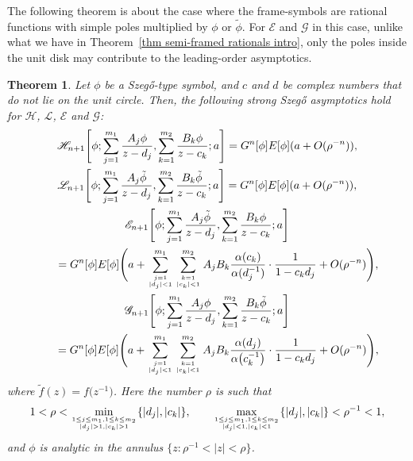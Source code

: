 \documentclass[10pt,a4paper]{amsart}
\numberwithin{equation}{section}
\newtheorem{Theorem}{Theorem}[section]
\newcommand{\al}{\alpha}
\newcommand{\di}{\displaystyle}
\begin{document}
	The following theorem is about the case where the frame-symbols are rational functions with simple poles multiplied by $\phi$ or $\tilde{\phi}$. For $\mathscr{E}$ and $\mathscr{G}$ in this case, unlike what we have in Theorem~\ref{thm semi-framed rationals intro}, only the poles inside the unit disk may contribute to the leading-order asymptotics.
	\begin{Theorem}\label{thm semi-framed rationals . phi intro} Let $\phi$ be a Szeg\H{o}-type symbol, and $c$ and $d$ be complex numbers that do not lie on the unit circle. Then, the following strong Szeg\H{o} asymptotics hold for $\mathscr{H}$, $\mathscr{L}$, $\mathscr{E}$ and $\mathscr{G}$:
		\begin{gather}
			\mathscr{H}_{n+1}\Bigg[\phi; \di \sum_{j=1}^{m_1} \di \frac{A_j \phi}{z-d_j}, \sum_{k=1}^{m_2} \di \frac{B_k\phi}{z-c_k};a\Bigg] = G^n[\phi] E[\phi] (a + O(\rho^{-n})),\label{asymp H rationals lin comb1}	
\\
			\mathscr{L}_{n+1}\Bigg[\phi; \di \sum_{j=1}^{m_1} \di \frac{A_j\tilde{\phi}}{z-d_j}, \sum_{k=1}^{m_2} \di \frac{B_k\tilde{\phi}}{z-c_k};a\Bigg] = G^n[\phi] E[\phi] (a + O(\rho^{-n})),	\nonumber
\\
			\mathscr{E}_{n+1}\Bigg[\phi; \di \sum_{j=1}^{m_1} \di \frac{A_j\tilde{\phi}}{z-d_j}, \sum_{k=1}^{m_2} \di \frac{B_k\phi}{z-c_k};a\Bigg] \nonumber
\\ \qquad= G^n[\phi] E[\phi] \Bigg( a + \sum^{m_1}_{j=1 \atop |d_j|<1 } \sum^{m_2}_{k=1 \atop |c_k|<1 } A_jB_k \frac{\al(c_k)}{\al(d_j^{-1})}\cdot \frac{1}{1-c_kd_j} +O(\rho^{-n}) \Bigg),	\nonumber
\\
			\mathscr{G}_{n+1}\Bigg[\phi; \di \sum_{j=1}^{m_1} \di \frac{A_j\phi}{z-d_j}, \sum_{k=1}^{m_2} \di \frac{B_k\tilde{\phi}}{z-c_k};a\Bigg] \nonumber
\\ \qquad= G^n[\phi] E[\phi] \Bigg( a + \sum^{m_1}_{j=1 \atop |d_j|<1 } \sum^{m_2}_{k=1 \atop |c_k|<1 } A_jB_k \frac{\al(d_j)}{\al\big(c_k^{-1}\big)}\cdot \frac{1}{1-c_kd_j} +O(\rho^{-n}) \Bigg),\label{asymp G rationals lin comb1}
		\end{gather}
		where $\tilde{f}(z) = f\big(z^{-1}\big)$. Here the number $\rho$ is such that
\[
1<\rho < \underset{1 \leq j \leq m_1, 1 \leq k \leq m_2 \atop |d_j|>1,|c_k|>1}{\min} \{|d_j|,|c_k|\}, \qquad \underset{1 \leq j \leq m_1, 1 \leq k \leq m_2 \atop |d_j|<1,|c_k|<1}{\max} \{|d_j|,|c_k|\}<\rho^{-1}<1,
\]
 and $\phi$ is analytic in the annulus $\big\{z\colon \rho^{-1}<|z|<\rho\big\}$.
	\end{Theorem}
\end{document}
